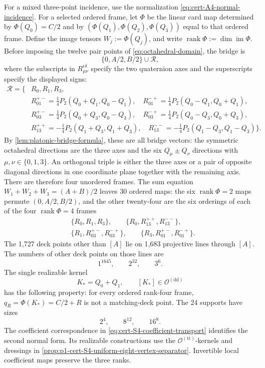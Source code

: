 \documentclass[11pt,letterpaper,onecolumn]{article}
\theoremstyle{plain}
\theoremstyle{definition}
\theoremstyle{remark}
\newcommand{\OctDD}{{\mathcal O^{(\mathrm{dd})}}}
\newcommand{\OctTT}{{\mathcal O^{(\mathrm{tt})}}}
\newcommand{\rank}{\operatorname{rank}}
\begin{document}
For a mixed three-point incidence, use the normalization
\eqref{eq:cert-A4-normal-incidence}.  For a selected ordered frame, let
\(\Phi\) be the linear card map determined by \(\Phi(Q_0)=C/2\) and by
\((\Phi(Q_1),\Phi(Q_2),\Phi(Q_3))\) equal to that ordered frame. Define the
image tensors \(W_j:=\Phi(Q_j)\), and write
\(\rank\Phi:=\dim\operatorname{im}\Phi\).  Before imposing the twelve pair
points of \eqref{eq:octahedral-domain}, the bridge is
\begin{equation*}
 \{0,A/2,B/2\}\cup\mathcal R,
\end{equation*}
where the subscripts in \(R_{\mu\nu}^{\epsilon\delta}\) specify the
two quaternion axes and the superscripts specify the displayed signs:
\begin{align*}
\mathcal R=\{&R_0,R_1,R_3,\\
&R_{01}^{+-}=\tfrac14P_2(Q_0+Q_1,Q_0-Q_1),
\quad R_{01}^{-+}=\tfrac14P_2(Q_0-Q_1,Q_0+Q_1),\\
&R_{03}^{+-}=\tfrac14P_2(Q_0+Q_3,Q_0-Q_3),
\quad R_{03}^{-+}=\tfrac14P_2(Q_0-Q_3,Q_0+Q_3),\\
&R_{13}^{++}=-\tfrac14P_2(Q_1+Q_3,Q_1+Q_3),
\quad R_{13}^{--}=-\tfrac14P_2(Q_1-Q_3,Q_1-Q_3)\}.
\end{align*}
By \cref{lem:platonic-bridge-formula}, these are all bridge vectors:
the symmetric octahedral directions are the three axes and the six
\(Q_\mu\pm Q_\nu\) directions with \(\mu,\nu\in\{0,1,3\}\).
An orthogonal triple is either the three axes or a pair of opposite
diagonal directions in one coordinate plane together with the remaining
axis.  There are therefore four unordered frames.  The sum equation
\(W_1+W_2+W_3=(A+B)/2\) leaves 30 ordered maps: the six
\(\rank\Phi=2\) maps permute \((0,A/2,B/2)\), and the other twenty-four are
the six orderings of each of the four \(\rank\Phi=4\) frames
\begin{equation}
 \begin{split}
 &\{R_0,R_1,R_3\},\qquad
 \{R_0,R_{13}^{++},R_{13}^{--}\},\\
 &\{R_1,R_{03}^{+-},R_{03}^{-+}\},\qquad
 \{R_3,R_{01}^{+-},R_{01}^{-+}\}.
 \end{split}
 \label{eq:cert-S4-four-frames}
\end{equation}
The 1,727 deck points other than \([A]\) lie on 1,683 projective lines
through \([A]\). The numbers of other deck points on those lines are
\[
 1^{1645},\qquad2^{32},\qquad3^6.
\]
The single realizable kernel
\begin{equation*}
 K_*=Q_0+Q_1,
 \qquad [K_*]\in\OctDD
\end{equation*}
has the following property: for every ordered rank-four frame,
\(q_R=\Phi(K_*)=C/2+R\) is not a matching-deck point.  The 24 supports
have sizes
\[
 2^4,\qquad8^{12},\qquad16^8.
\]
The coefficient correspondence in
\cref{eq:cert-S4-coefficient-transport} identifies the second normal form.
Its realizable constructions use the
\(\OctTT\)-kernels and dressings in
\cref{prop:p1-cert-S4-uniform-eight-vertex-separator}.   Invertible local coefficient maps
preserve the three ranks.
\end{document}
